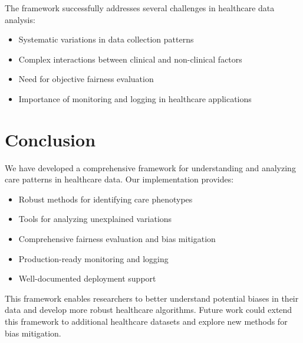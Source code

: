 \documentclass[12pt]{article}
\begin{document}
The framework successfully addresses several challenges in healthcare data analysis:
\begin{itemize}
    \item Systematic variations in data collection patterns
    \item Complex interactions between clinical and non-clinical factors
    \item Need for objective fairness evaluation
    \item Importance of monitoring and logging in healthcare applications
\end{itemize}

\section{Conclusion}

We have developed a comprehensive framework for understanding and analyzing care patterns in healthcare data. Our implementation provides:

\begin{itemize}
    \item Robust methods for identifying care phenotypes
    \item Tools for analyzing unexplained variations
    \item Comprehensive fairness evaluation and bias mitigation
    \item Production-ready monitoring and logging
    \item Well-documented deployment support
\end{itemize}

This framework enables researchers to better understand potential biases in their data and develop more robust healthcare algorithms. Future work could extend this framework to additional healthcare datasets and explore new methods for bias mitigation.



\end{document}
